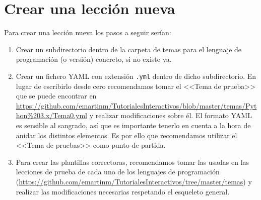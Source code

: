 \documentclass[]{article}
\newcommand{\code}[1]{{\lstinline[basicstyle=\ttfamily,mathescape]!#1!}}
\begin{document}
\section{Crear una lección nueva}
Para crear una lección nueva los pasos a seguir serían:
\begin{enumerate}
	\item Crear un subdirectorio dentro de la carpeta de temas para el lenguaje de programación (o versión) concreto, si no existe ya.
	\item Crear un fichero YAML con extensión \code{.yml} dentro de dicho subdirectorio. En lugar de escribirlo desde cero recomendamos tomar el <<Tema de prueba>> que se puede encontrar en \url{https://github.com/emartinm/TutorialesInteractivos/blob/master/temas/Python%203.x/Tema0.yml} 
	y realizar modificaciones sobre él. El formato YAML es sensible al sangrado, así que es importante tenerlo en cuenta a la hora de anidar los distintos elementos. Es por ello que recomendamos utilizar el <<Tema de pruebas>> como punto de partida. %
	\item Para crear las plantillas correctoras, recomendamos tomar las usadas en las lecciones de prueba de cada uno de los lenguajes de programación (\url{https://github.com/emartinm/TutorialesInteractivos/tree/master/temas}) y realizar las modificaciones necesarias respetando el esqueleto general.
\end{enumerate}
\end{document}
